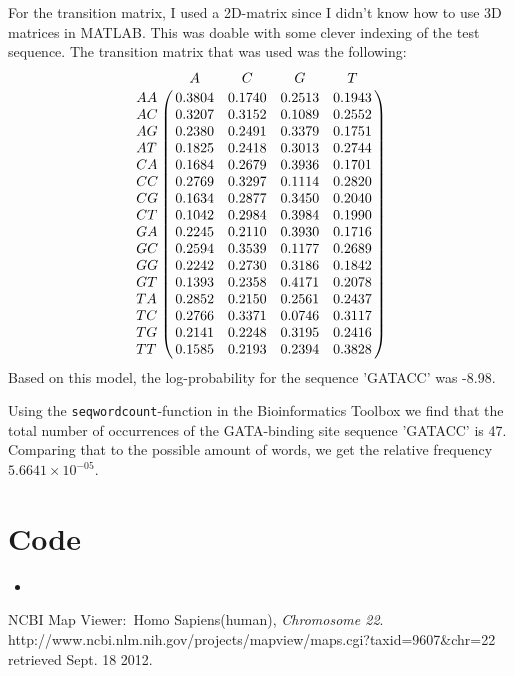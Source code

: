 \documentclass{article}
\newcommand{\matlabscript}[2]
  {\begin{itemize}\item[]\end{itemize}}
\begin{document}
\begin{spacing}{1.1}
{For the transition matrix, I used a 2D-matrix since I didn't know how to use 3D matrices in MATLAB. This was doable with some clever indexing of the test sequence. The transition matrix that was used was the following:
\begin{displaymath}
 \bordermatrix{
 & A & C & G & T \cr
 AA & 0.3804 &    0.1740 &    0.2513 &    0.1943 \cr
 AC & 0.3207 &    0.3152 &    0.1089 &    0.2552 \cr
 AG & 0.2380 &    0.2491 &    0.3379 &    0.1751 \cr
 AT & 0.1825 &    0.2418 &    0.3013 &    0.2744 \cr
 CA & 0.1684 &    0.2679 &    0.3936 &    0.1701 \cr
 CC & 0.2769 &    0.3297 &    0.1114 &    0.2820 \cr
 CG & 0.1634 &    0.2877 &    0.3450 &    0.2040 \cr
 CT & 0.1042 &    0.2984 &    0.3984 &    0.1990 \cr
 GA & 0.2245 &    0.2110 &    0.3930 &    0.1716 \cr
 GC & 0.2594 &    0.3539 &    0.1177 &    0.2689 \cr
 GG & 0.2242 &    0.2730 &    0.3186 &    0.1842 \cr
 GT & 0.1393 &    0.2358 &    0.4171 &    0.2078 \cr
 TA & 0.2852 &    0.2150 &    0.2561 &    0.2437 \cr
 TC & 0.2766 &    0.3371 &    0.0746 &    0.3117 \cr
 TG & 0.2141 &    0.2248 &    0.3195 &    0.2416 \cr
 TT & 0.1585 &    0.2193 &    0.2394 &    0.3828 }
\end{displaymath}
Based on this model, the log-probability for the sequence 'GATACC' was -8.98.

Using the \texttt{seqwordcount}-function in the Bioinformatics Toolbox we find that the total number of occurrences of the GATA-binding site sequence 'GATACC' is 47. Comparing that to the possible amount of words, we get the relative frequency $5.6641\times10^{-05}$.
}
\appendix
\section{Code}
\matlabscript{ex1}{}
\end{spacing}

\begin{thebibliography}{9}
   NCBI Map Viewer: Homo Sapiens(human),
   \emph{Chromosome 22}.\\
   http://www.ncbi.nlm.nih.gov/projects/mapview/maps.cgi?taxid=9607\&chr=22\\
   retrieved Sept. 18 2012.

\end{thebibliography}
\end{document}
